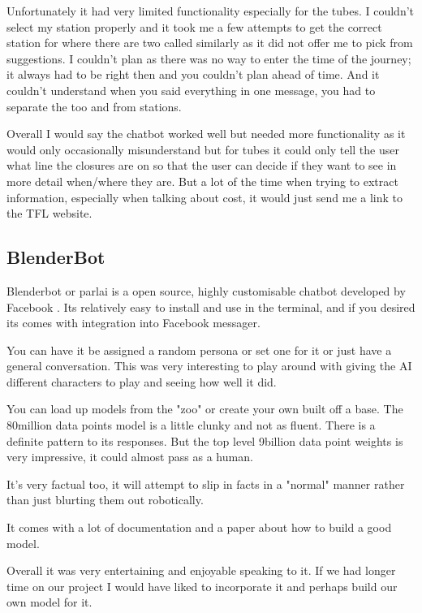 \documentclass[11pt]{article}
\begin{document}
	Unfortunately it had very limited functionality especially for the tubes. I couldn't select my station properly and it took me a few attempts to get the correct station for where there are two called similarly as it did not offer me to pick from suggestions. I couldn't plan as there was no way to enter the time of the journey; it always had to be right then and you couldn't plan ahead of time. And it couldn't understand when you said everything in one message, you had to separate the too and from stations.
	
	Overall I would say the chatbot worked well but needed more functionality as it would only occasionally misunderstand but for tubes it could only tell the user what line the closures are on so that the user can decide if they want to see in more detail when/where they are. 
	But a lot of the time when trying to extract information, especially when talking about cost, it would just send me a link to the TFL website. 
	
	\subsection{BlenderBot}
	Blenderbot or parlai is a open source, highly customisable chatbot developed by Facebook \citet{roller2020recipes}. Its relatively easy to install and use in the terminal, and if you desired its comes with integration into Facebook messager. 
	
	You can have it be assigned a random persona or set one for it or just have a general conversation. This was very interesting to play around with giving the AI different characters to play and seeing how well it did. 
	
	You can load up models from the "zoo" or create your own built off a base. The 80million data points model is a little clunky and not as fluent. There is a definite pattern to its responses. But the top level 9billion data point weights is very impressive, it could almost pass as a human. 
	
	It's very factual too, it will attempt to slip in facts in a "normal" manner rather than just blurting them out robotically. 
	
	It comes with a lot of documentation and a paper about how to build a good model. 
	
	Overall it was very entertaining and enjoyable speaking to it. If we had longer time on our project I would have liked to incorporate it and perhaps build our own model for it. 
	
\end{document}
